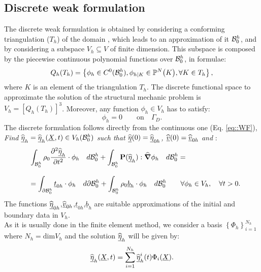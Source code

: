 \subsection{Discrete weak formulation}
\label{sct-DiscreteWF}
The discrete weak formulation is obtained by considering a conforming triangulation ($T_h$) of the domain \RefCon, which leads to an approximation of it $\mathcal{B}_0^h$, and by considering a subspace $V_h\subseteq V$ of finite dimension. This subspace is composed by the piecewise continuous polynomial functions over $\mathcal{B}_0^h$, in formulae:
\begin{equation}
  Q_h(T_h)=\left\{\phi_h \in C^0(\mathcal{B}_0^h), \phi_{h|K} \in \mathbb{P}^N\big(K\big), \forall K \in T_h\right\},
  \label{eq::SpaceDiscrete}
\end{equation} 
where $K$ is an element of the triangulation $T_h$. The discrete functional space to approximate the solution of the structural mechanic problem is $V_h=\left[Q_h(T_h)\right]^3$. Moreover, any function $\phi_h\in V_h$ has to satisfy:
\begin{displaymath}
  \phi_h=0 \qquad \text{on}\quad\Gamma_D.
\end{displaymath}
The discrete formulation follows directly from the continuous one (Eq. \eqref{eq::WF}),\\
\textit{Find $\widehat{\underline{\eta}}_h=\widehat{\underline{\eta}}_h(\underline{X},t)\in V_h(\mathcal{B}_0^h)$ such that $\widehat{\underline{\eta}}(0)=\widehat{\underline{\eta}}_{0h}$, $\widehat{\underline{v}}(0)=\widehat{\underline{v}}_{0h}$ and} :
\begin{equation}
  \begin{array}{lll}
    & \displaystyle \int_{\mathcal{B}_0^h}\rho_0\frac{\partial^2 \widehat{\underline{\eta}}_h}{\partial t^2}\cdot\phi_h\quad d\mathcal{B}_0^h  + \int_{\mathcal{B}_0^h}\textbf{P}(\widehat{\underline{\eta}}_h):\widehat{\boldsymbol{\nabla}}\phi_h\quad d\mathcal{B}_0^h = \\
    \\
    & \displaystyle = \int_{\partial \mathcal{B}_0^h}\underline{t}_{0h}\cdot\phi_h\quad d\partial\mathcal{B}_0^h + \int_{\mathcal{B}_0^h}\rho_0 \underline{b}_h\cdot\phi_h\quad d\mathcal{B}_0^h \qquad \forall \phi_h\in V_h, \quad \forall t>0.
    \end{array}
  \label{eq::DWF}
\end{equation}
The functions $\widehat{\underline{\eta}}_{0h}$,$\widehat{\underline{v}}_{0h}$,$\underline{t}_{0h}$,$\underline{b}_h$ are suitable approximations of the initial and boundary data in $V_h$.\\
As it is usually done in the finite element method, we consider a basis $\left\{\Phi_h\right\}_{i=1}^{N_h}$ where $N_h=\text{dim}V_h$  and the solution $\widehat{\underline{\eta}}_h$ will be given by:
\begin{equation}
  \displaystyle \widehat{\underline{\eta}}_h(\underline{X},t)= \sum_{i=1}^{N_h}\widehat{\underline{\eta}}_h^i(t)\Phi_i(\underline{X}).
  \label{eq::DiscreteSolution}
\end{equation}
